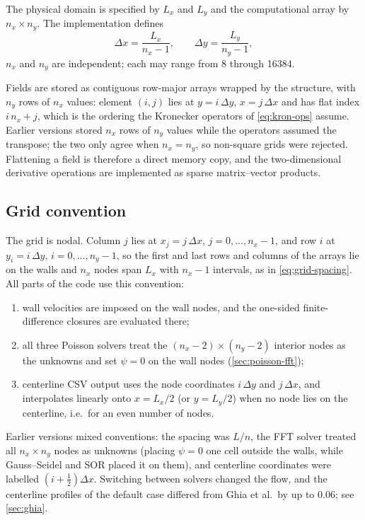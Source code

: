 \documentclass[11pt,a4paper]{article}
\newcommand{\dx}{\Delta x}
\newcommand{\dy}{\Delta y}
\newcommand{\code}[1]{\texttt{\detokenize{#1}}}
\begin{document}
The physical domain is specified by $L_x$ and $L_y$ and the computational array by $n_x\times n_y$.  The implementation defines
\begin{equation}
\dx=\frac{L_x}{n_x-1},
\qquad
\dy=\frac{L_y}{n_y-1},
\label{eq:grid-spacing}
\end{equation}
$n_x$ and $n_y$ are independent; each may range from 8 through 16384.

Fields are stored as contiguous row-major arrays wrapped by the \code{mtrx} structure, with $n_y$ rows of $n_x$ values: element $(i,j)$ lies at $y=i\,\dy$, $x=j\,\dx$ and has flat index $i\,n_x+j$, which is the ordering the Kronecker operators of \cref{eq:kron-ops} assume.  Earlier versions stored $n_x$ rows of $n_y$ values while the operators assumed the transpose; the two only agree when $n_x=n_y$, so non-square grids were rejected.  Flattening a field is therefore a direct memory copy, and the two-dimensional derivative operations are implemented as sparse matrix--vector products.

\subsection{Grid convention}

The grid is nodal.  Column $j$ lies at $x_j=j\,\dx$, $j=0,\dots,n_x-1$, and row $i$ at $y_i=i\,\dy$, $i=0,\dots,n_y-1$, so the first and last rows and columns of the arrays lie on the walls and $n_x$ nodes span $L_x$ with $n_x-1$ intervals, as in \cref{eq:grid-spacing}.  All parts of the code use this convention:

\begin{enumerate}[leftmargin=2em]
  \item wall velocities are imposed on the wall nodes, and the one-sided finite-difference closures are evaluated there;
  \item all three Poisson solvers treat the $(n_x-2)\times(n_y-2)$ interior nodes as the unknowns and set $\psi=0$ on the wall nodes (\cref{sec:poisson-fft});
  \item centerline CSV output uses the node coordinates $i\,\dy$ and $j\,\dx$, and interpolates linearly onto $x=L_x/2$ (or $y=L_y/2$) when no node lies on the centerline, i.e.\ for an even number of nodes.
\end{enumerate}

Earlier versions mixed conventions: the spacing was $L/n$, the FFT solver treated all $n_x\times n_y$ nodes as unknowns (placing $\psi=0$ one cell outside the walls, while Gauss--Seidel and SOR placed it on them), and centerline coordinates were labelled $(i+\tfrac12)\dx$.  Switching between solvers changed the flow, and the centerline profiles of the default case differed from Ghia et al.\ by up to $0.06$; see \cref{sec:ghia}.
\end{document}
